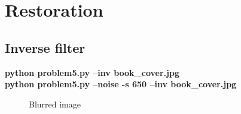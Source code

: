 \pagebreak
\section{Restoration}

\subsection{Inverse filter}

\begin{minipage}{\textwidth}
\textbf{python problem5.py --inv book\_cover.jpg} \\
\textbf{python problem5.py --noise -s 650 --inv book\_cover.jpg}
\end{minipage}

\begin{figure}[!htb]\centering
    \begin{minipage}{0.45\textwidth}
        \caption{\small{Blurred image}}
    \end{minipage}
    \begin{minipage}{0.45\textwidth}

\end{minipage}
\end{figure}
